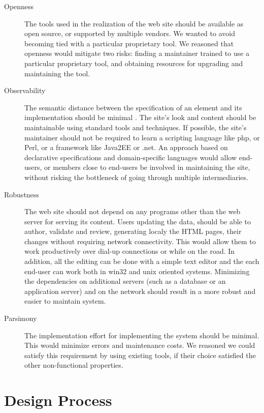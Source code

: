 \documentclass[10pt]{article}
\begin{document}
\begin{description}
\item[Openness] The tools used in the realization of the web site
should be available as open source, or supported by multiple vendors.
We wanted to avoid becoming tied with a particular proprietary
tool.
We reasoned that openness would mitigate two risks:
finding a maintainer trained to use a particular proprietary tool,
and obtaining resources for upgrading and maintaining the tool.

\item[Observability]
The semantic distance between
the specification of an element and its implementation 
should be minimal \cite{SG97}.
The site's look and content should be maintainable
using standard tools and techniques.
If possible, the site's maintainer should not be required to
learn a scripting language like {\sc php}, or Perl, or
a framework like Java2EE or {\sc .net}.
An approach based on declarative specifications and
domain-specific languages would allow end-users, or members
close to end-users be involved in maintaining the site,
without risking the bottleneck of going through
multiple intermediaries.

\item[Robustness] The web site should not depend on
any programs other than the web server for serving
its content.
Users updating the data, should be able to author, validate and 
review, generating localy the HTML pages, 
their changes without requiring network connectivity.
This would allow them to work productively over dial-up connections
or while on the road. In addition, all the editing can be done with 
a simple text editor and the each end-user can work both in win32 
and unix oriented systems.
Minimizing the dependencies on additional servers (such as a
database or an application server) and on the network
should result in a more robust and easier to maintain system.   

\item[Parsimony] The implementation effort for
implementing the system should be minimal.
This would minimize errors and maintenance costs.
We reasoned we could satisfy this requirement by
using existing tools, if their choice satisfied the
other non-functional properties.
\end{description} 

\section{Design Process}
\end{document}
